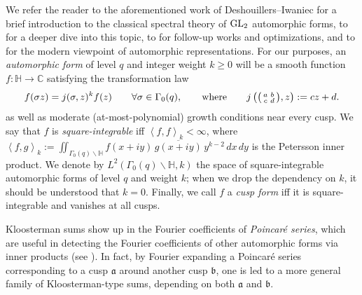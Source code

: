 \documentclass[reqno,11pt]{amsart}
\theoremstyle{remark}
\numberwithin{equation}{section}
\newcommand{\C}{\mathbb{C}}
\renewcommand{\H}{\mathbb{H}}
\newcommand{\ma}{\mathfrak{a}}
\newcommand{\mb}{\mathfrak{b}}
\newcommand{\GL}{\textnormal{GL}}
\newcommand{\la}{\left\langle}
\newcommand{\ra}{\right\rangle}
\renewcommand{\bar}{\overline}
\newenvironment{psmall}
  {\left(\begin{smallmatrix}}
  {\end{smallmatrix}\right)}
\begin{document}
We refer the reader to the aforementioned work of Deshouillers--Iwaniec \cite{deshouillers1982kloosterman} for a brief introduction to the classical spectral theory of $\GL_2$ automorphic forms, to \cite{iwaniec2021spectral,iwaniec1997topics,iwaniec2021analytic} for a deeper dive into this topic, to \cite{drappeau2017sums,topacogullari2018shifted,drappeau2023one,de2020niveau,lichtman2023primes,pascadi2023smooth} for follow-up works and optimizations, and to \cite{bump1998automorphic,goldfeld2011automorphic} for the modern viewpoint of automorphic representations. For our purposes, an \emph{automorphic form} of level $q$ and integer weight $k \ge 0$ will be a smooth function $f : \H \to \C$ satisfying the transformation law
\[
    f(\sigma z) = j(\sigma, z)^k f(z)
    \qquad 
    \forall \sigma \in \Gamma_0(q),
    \qquad 
    \text{where}
    \qquad 
    j\left(\begin{psmall} a & b \\ c & d \end{psmall}, z\right) := cz+d. 
\]
as well as moderate (at-most-polynomial) growth conditions near every cusp. We say that $f$ is \emph{square-integrable} iff $\la f, f \ra_k < \infty$, where
$\la f, g \ra_k := \iint_{\Gamma_0(q) \backslash \H} f(x+iy)\, \bar{g(x+iy)}\,  y^{k-2}\, dx\, dy$ is the Petersson inner product. We denote by $L^2(\Gamma_0(q) \backslash \H, k)$ the space of square-integrable automorphic forms of level $q$ and weight $k$; when we drop the dependency on $k$, it should be understood that $k = 0$. Finally, we call $f$ a \emph{cusp form} iff it is square-integrable and vanishes at all cusps. 

Kloosterman sums show up in the Fourier coefficients of \emph{Poincar\'e series}, which are useful in detecting the Fourier coefficients of other automorphic forms via inner products (see \cite[(1.8), (1.18)]{deshouillers1982kloosterman}). In fact, by Fourier expanding a Poincar\'e series corresponding to a cusp $\ma$ around another cusp $\mb$, one is led to a more general family of Kloosterman-type sums, depending on both $\ma$ and $\mb$. 
\end{document}
